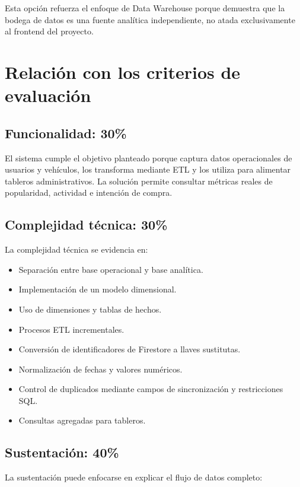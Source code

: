 \documentclass[12pt,letterpaper]{article}
\begin{document}
Esta opción refuerza el enfoque de Data Warehouse porque demuestra que la bodega de datos es una fuente analítica independiente, no atada exclusivamente al frontend del proyecto.

\section{Relación con los criterios de evaluación}

\subsection{Funcionalidad: 30\%}

El sistema cumple el objetivo planteado porque captura datos operacionales de usuarios y vehículos, los transforma mediante ETL y los utiliza para alimentar tableros administrativos. La solución permite consultar métricas reales de popularidad, actividad e intención de compra.

\subsection{Complejidad técnica: 30\%}

La complejidad técnica se evidencia en:

\begin{itemize}
    \item Separación entre base operacional y base analítica.
    \item Implementación de un modelo dimensional.
    \item Uso de dimensiones y tablas de hechos.
    \item Procesos ETL incrementales.
    \item Conversión de identificadores de Firestore a llaves sustitutas.
    \item Normalización de fechas y valores numéricos.
    \item Control de duplicados mediante campos de sincronización y restricciones SQL.
    \item Consultas agregadas para tableros.
\end{itemize}

\subsection{Sustentación: 40\%}

La sustentación puede enfocarse en explicar el flujo de datos completo:
\end{document}
